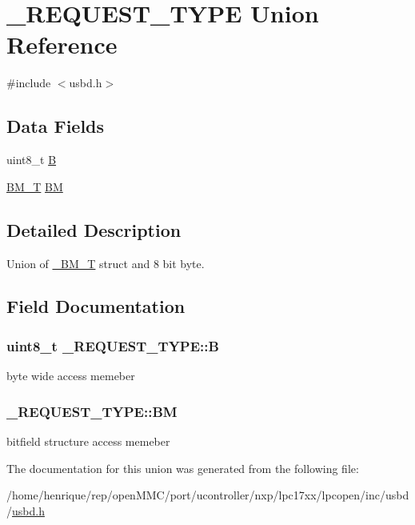 \hypertarget{union__REQUEST__TYPE}{\section{\-\_\-\-R\-E\-Q\-U\-E\-S\-T\-\_\-\-T\-Y\-P\-E Union Reference}
\label{union__REQUEST__TYPE}
}


{\ttfamily \#include $<$usbd.\-h$>$}

\subsection*{Data Fields}
\begin{DoxyCompactItemize}
\item 
uint8\-\_\-t \hyperlink{union__REQUEST__TYPE_a4ea7b8b71f7922b27a4b7833afcd645d}{B}
\item 
\hyperlink{group__USBD__Core_ga0c191764322e096fa81c1228eb62e63f}{B\-M\-\_\-\-T} \hyperlink{union__REQUEST__TYPE_aeb4f47d17f203fbb11ffd16c454dde0c}{B\-M}
\end{DoxyCompactItemize}


\subsection{Detailed Description}
Union of \hyperlink{struct__BM__T}{\-\_\-\-B\-M\-\_\-\-T} struct and 8 bit byte. 

\subsection{Field Documentation}
\hypertarget{union__REQUEST__TYPE_a4ea7b8b71f7922b27a4b7833afcd645d}{
\subsubsection[{B}]{\setlength{\rightskip}{0pt plus 5cm}uint8\-\_\-t \-\_\-\-R\-E\-Q\-U\-E\-S\-T\-\_\-\-T\-Y\-P\-E\-::\-B}}\label{union__REQUEST__TYPE_a4ea7b8b71f7922b27a4b7833afcd645d}
byte wide access memeber \hypertarget{union__REQUEST__TYPE_aeb4f47d17f203fbb11ffd16c454dde0c}{
\subsubsection[{B\-M}]{ \-\_\-\-R\-E\-Q\-U\-E\-S\-T\-\_\-\-T\-Y\-P\-E\-::\-B\-M}}\label{union__REQUEST__TYPE_aeb4f47d17f203fbb11ffd16c454dde0c}
bitfield structure access memeber 

The documentation for this union was generated from the following file\-:\begin{DoxyCompactItemize}
\item 
/home/henrique/rep/open\-M\-M\-C/port/ucontroller/nxp/lpc17xx/lpcopen/inc/usbd/\hyperlink{usbd_8h}{usbd.\-h}\end{DoxyCompactItemize}
